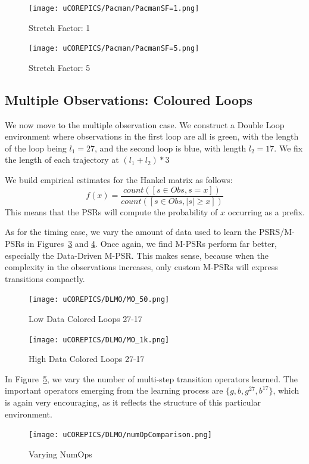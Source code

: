 \begin{figure}[ht!]
\centering
\texttt{[image: uCOREPICS/Pacman/PacmanSF=1.png]}
\caption{Stretch Factor: 1\label{fig-pacsf1}}
\end{figure}

\begin{figure}[ht!]
\centering
\texttt{[image: uCOREPICS/Pacman/PacmanSF=5.png]}
\caption{Stretch Factor: 5\label{fig-pacsf5}}
\end{figure}

\subsection{Multiple Observations: Coloured Loops}

We now move to the multiple observation case. We construct a Double Loop environment where observations in the first loop are all is green, with the length of the loop being $l_1=27$, and the second loop is blue, with length $l_2=17$. We fix the length of each trajectory at 
$(l_1 + l_2)*3$

We build empirical estimates for the Hankel matrix as follows:
\begin{equation*}
 f(x)=\dfrac{count([s \in Obs, s=x])}{count([s \in Obs, |s| \geq x])}
\end{equation*}  
This means that the PSRs will compute the probability of $x$ occurring as a prefix.


As for the timing case, we vary the amount of data used to  learn the PSRS/M-PSRs in Figures~\ref{fig-collow} and \ref{fig-colhigh}. Once again, we find M-PSRs perform far better, especially the Data-Driven M-PSR. This makes sense, because when the complexity in the observations increases, only custom M-PSRs will express transitions compactly.


\begin{figure}[ht!]
\centering
\texttt{[image: uCOREPICS/DLMO/MO\_50.png]}
\caption{Low Data Colored Loops 27-17\label{fig-collow}}
\end{figure}

\begin{figure}[ht!]
\centering
\texttt{[image: uCOREPICS/DLMO/MO\_1k.png]}
\caption{High Data Colored Loops 27-17\label{fig-colhigh}}
\end{figure}



In Figure~\ref{fig-colnumops}, we vary the number of multi-step transition operators learned. The important operators emerging from the learning process are $\{g,b,g^{27},b^{17}\}$, which is again very encouraging, as it reflects the structure of this particular environment.

\begin{figure}[ht!]
\centering
\texttt{[image: uCOREPICS/DLMO/numOpComparison.png]}
\caption{Varying NumOps\label{fig-colnumops}}
\end{figure}
